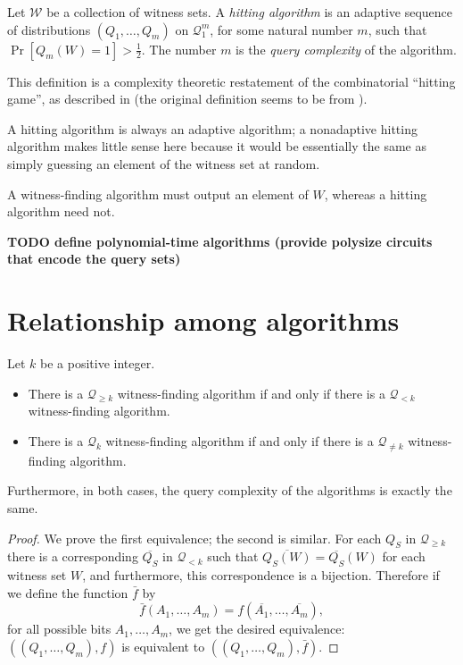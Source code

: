 \documentclass{article}
\newcommand{\todo}[1]{\textbf{TODO #1}}
\newcommand{\mc}{\mathcal}
\begin{document}
\begin{definition}
  Let $\mc{W}$ be a collection of witness sets.
  A \emph{hitting algorithm} is an adaptive sequence of distributions $(Q_1, \dotsc, Q_m)$ on $\mc{Q}^m_1$, for some natural number $m$, such that $\Pr[Q_m(W) = 1] > \frac{1}{2}$.
  The number $m$ is the \emph{query complexity} of the algorithm.
\end{definition}

This definition is a complexity theoretic restatement of the combinatorial ``hitting game'', as described in \autocite[Section~3]{newport14} (the original definition seems to be from \autocite[Definition~5]{bgi92}).

A hitting algorithm is always an adaptive algorithm; a nonadaptive hitting algorithm makes little sense here because it would be essentially the same as simply guessing an element of the witness set at random.

A witness-finding algorithm must output an element of $W$, whereas a hitting algorithm need not.

\todo{define polynomial-time algorithms (provide polysize circuits that encode the query sets)}

\section{Relationship among algorithms}

\begin{proposition}\label{prop:flip}
  Let $k$ be a positive integer.
  \begin{itemize}
  \item There is a $\mc{Q}_{\geq k}$ witness-finding algorithm if and only if there is a $\mc{Q}_{< k}$ witness-finding algorithm.
  \item There is a $\mc{Q}_k$ witness-finding algorithm if and only if there is a $\mc{Q}_{\neq k}$ witness-finding algorithm.
  \end{itemize}
  Furthermore, in both cases, the query complexity of the algorithms is exactly the same.
\end{proposition}
\begin{proof}
  We prove the first equivalence; the second is similar.
  For each $Q_S$ in $\mc{Q}_{\geq k}$ there is a corresponding $\overline{Q_S}$ in $\mc{Q}_{< k}$ such that $\overline{Q_S(W)} = \overline{Q_S}(W)$ for each witness set $W$, and furthermore, this correspondence is a bijection.
  Therefore if we define the function $\bar{f}$ by
  \begin{equation*}
    \bar{f}(A_1, \dotsc, A_m) = f(\overline{A_1}, \dotsc, \overline{A_m}),
  \end{equation*}
  for all possible bits $A_1, \dotsc, A_m$, we get the desired equivalence: $((Q_1, \dotsc, Q_m), f)$ is equivalent to $((Q_1, \dotsc, Q_m), \bar{f})$.
\end{proof}
\end{document}
